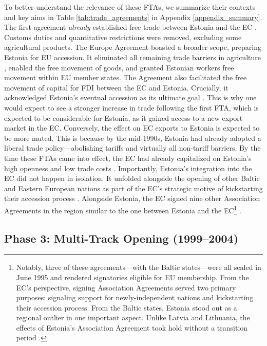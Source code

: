 \documentclass[a4paper,10pt]{article}
\begin{document}
To better understand the relevance of these FTAs, we summarize their contexts and key aims in Table \ref{tab:trade_agreements} in Appendix \ref{appendix_summary}. The first agreement \textit{already} established free trade between Estonia and the EC \citep{pisuke_estonia_1996}. Customs duties and quantitative restrictions were removed, excluding some agricultural products. The Europe Agreement boasted a broader scope, preparing Estonia for EU accession. It eliminated all remaining trade barriers in agriculture \citep{westin_baltic_1998},  enabled the free movement of goods, and granted Estonian workers free movement within EU member states. The Agreement also facilitated the free movement of capital for FDI between the EC and Estonia. Crucially, it acknowledged Estonia's eventual accession as its ultimate goal \citep{soete_dissecting_2017}. This is why one would expect to see a stronger increase in trade following the first FTA, which is expected to be considerable for Estonia, as it gained access to a new export market in the EC. Conversely, the effect on EC exports to Estonia is expected to be more muted. This is because by the mid-1990s, Estonia had already adopted a liberal trade policy---abolishing tariffs and virtually all non-tariff barriers. By the time these FTAs came into effect, the EC had already capitalized on Estonia's high openness and low trade costs \citep{soete_dissecting_2017}. Importantly, Estonia's integration into the EC did not happen in isolation.  It unfolded alongside the opening of other Baltic and Eastern European nations as part of the EC's strategic motive of kickstarting their accession process \citep{westin_baltic_1998}. Alongside Estonia, the EC signed nine other Association Agreements in the region similar to the one between Estonia and the EC\footnote{Notably, three of these agreements---with the Baltic states---were all sealed in June 1995 and rendered signatories eligible for EU membership. From the EC’s perspective, signing Association Agreements served two primary purposes: signaling support for newly-independent nations and kickstarting their accession process. From the Baltic states, Estonia stood out as a regional outlier in one important aspect. Unlike Latvia and Lithuania, the effects of Estonia’s Association Agreement took hold without a transition period \cite{westin_baltic_1998}.} \citep{shen_baltic_1996}.

\subsection{Phase 3: Multi-Track Opening (1999--2004)} \label{phase3}
\end{document}
